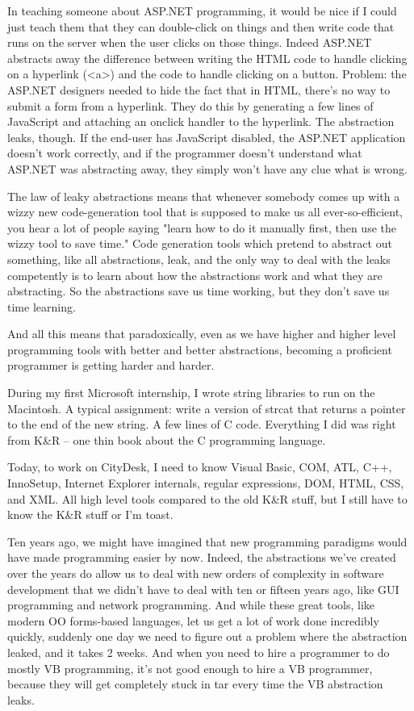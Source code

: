 \documentclass{article}
\begin{document}
In teaching someone about ASP.NET programming, it would be nice if I could just teach them that they can double-click on things and then write code that runs on the server when the user clicks on those things. Indeed ASP.NET abstracts away the difference between writing the HTML code to handle clicking on a hyperlink (<a>) and the code to handle clicking on a button. Problem: the ASP.NET designers needed to hide the fact that in HTML, there's no way to submit a form from a hyperlink. They do this by generating a few lines of JavaScript and attaching an onclick handler to the hyperlink. The abstraction leaks, though. If the end-user has JavaScript disabled, the ASP.NET application doesn't work correctly, and if the programmer doesn't understand what ASP.NET was abstracting away, they simply won't have any clue what is wrong.

The law of leaky abstractions means that whenever somebody comes up with a wizzy new code-generation tool that is supposed to make us all ever-so-efficient, you hear a lot of people saying "learn how to do it manually first, then use the wizzy tool to save time." Code generation tools which pretend to abstract out something, like all abstractions, leak, and the only way to deal with the leaks competently is to learn about how the abstractions work and what they are abstracting. So the abstractions save us time working, but they don't save us time learning.

And all this means that paradoxically, even as we have higher and higher level programming tools with better and better abstractions, becoming a proficient programmer is getting harder and harder.

During my first Microsoft internship, I wrote string libraries to run on the Macintosh. A typical assignment: write a version of strcat that returns a pointer to the end of the new string. A few lines of C code. Everything I did was right from K\&R -- one thin book about the C programming language.

Today, to work on CityDesk, I need to know Visual Basic, COM, ATL, C++, InnoSetup, Internet Explorer internals, regular expressions, DOM, HTML, CSS, and XML. All high level tools compared to the old K\&R stuff, but I still have to know the K\&R stuff or I'm toast.

Ten years ago, we might have imagined that new programming paradigms would have made programming easier by now. Indeed, the abstractions we've created over the years do allow us to deal with new orders of complexity in software development that we didn't have to deal with ten or fifteen years ago, like GUI programming and network programming. And while these great tools, like modern OO forms-based languages, let us get a lot of work done incredibly quickly, suddenly one day we need to figure out a problem where the abstraction leaked, and it takes 2 weeks. And when you need to hire a programmer to do mostly VB programming, it's not good enough to hire a VB programmer, because they will get completely stuck in tar every time the VB abstraction leaks.
\end{document}
